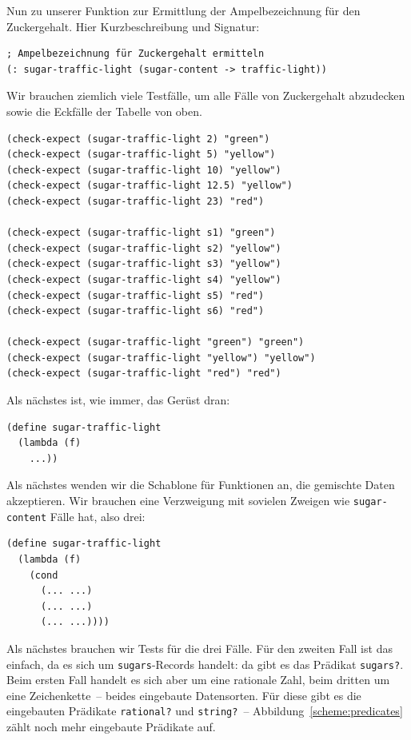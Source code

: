 Nun zu unserer Funktion zur Ermittlung der Ampelbezeichnung für den
Zuckergehalt.  Hier Kurzbeschreibung und Signatur:
%
\begin{verbatim}
; Ampelbezeichnung für Zuckergehalt ermitteln
(: sugar-traffic-light (sugar-content -> traffic-light))
\end{verbatim}
%
Wir brauchen ziemlich viele Testfälle, um alle Fälle von
Zuckergehalt abzudecken sowie die Eckfälle der Tabelle von oben.
%
\begin{verbatim}
(check-expect (sugar-traffic-light 2) "green")
(check-expect (sugar-traffic-light 5) "yellow")
(check-expect (sugar-traffic-light 10) "yellow")
(check-expect (sugar-traffic-light 12.5) "yellow")
(check-expect (sugar-traffic-light 23) "red")

(check-expect (sugar-traffic-light s1) "green")
(check-expect (sugar-traffic-light s2) "yellow")
(check-expect (sugar-traffic-light s3) "yellow")
(check-expect (sugar-traffic-light s4) "yellow")
(check-expect (sugar-traffic-light s5) "red")
(check-expect (sugar-traffic-light s6) "red")

(check-expect (sugar-traffic-light "green") "green")
(check-expect (sugar-traffic-light "yellow") "yellow")
(check-expect (sugar-traffic-light "red") "red")
\end{verbatim}
%
Als nächstes ist, wie immer, das Gerüst dran:
%
\begin{verbatim}
(define sugar-traffic-light
  (lambda (f)
    ...))
\end{verbatim}         
%
Als nächstes wenden wir die Schablone für Funktionen an, die gemischte
Daten akzeptieren.  Wir brauchen eine Verzweigung mit sovielen Zweigen
wie \texttt{sugar-content} Fälle hat, also drei:
%
\begin{verbatim}
(define sugar-traffic-light
  (lambda (f)
    (cond
      (... ...)
      (... ...)
      (... ...))))
\end{verbatim}         
%
Als nächstes brauchen wir Tests für die drei Fälle.  Für den zweiten
Fall ist das einfach, da es sich um \texttt{sugars}-Records handelt:
da gibt es das Prädikat \texttt{sugars?}.  Beim ersten Fall handelt es
sich aber um eine rationale Zahl, beim dritten um eine Zeichenkette~--
beides eingebaute Datensorten.  Für diese gibt es die eingebauten
Prädikate \texttt{rational?} und \texttt{string?}~--
Abbildung~\ref{scheme:predicates} zählt noch mehr eingebaute
Prädikate auf.
%
